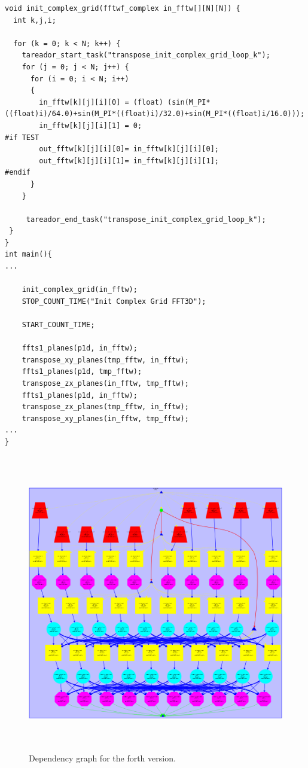 \documentclass[12]{article}
\begin{document}
\begin{lstlisting}
void init_complex_grid(fftwf_complex in_fftw[][N][N]) {
  int k,j,i;

  for (k = 0; k < N; k++) {
    tareador_start_task("transpose_init_complex_grid_loop_k");
    for (j = 0; j < N; j++) {
      for (i = 0; i < N; i++)
      {
        in_fftw[k][j][i][0] = (float) (sin(M_PI*((float)i)/64.0)+sin(M_PI*((float)i)/32.0)+sin(M_PI*((float)i/16.0)));
        in_fftw[k][j][i][1] = 0;
#if TEST
        out_fftw[k][j][i][0]= in_fftw[k][j][i][0];
        out_fftw[k][j][i][1]= in_fftw[k][j][i][1];
#endif
      }
    }
 
     tareador_end_task("transpose_init_complex_grid_loop_k"); 
 }
}
int main(){
...

    init_complex_grid(in_fftw);
    STOP_COUNT_TIME("Init Complex Grid FFT3D");

    START_COUNT_TIME;

    ffts1_planes(p1d, in_fftw);
    transpose_xy_planes(tmp_fftw, in_fftw);
    ffts1_planes(p1d, tmp_fftw);
    transpose_zx_planes(in_fftw, tmp_fftw);
    ffts1_planes(p1d, in_fftw);
    transpose_zx_planes(tmp_fftw, in_fftw);
    transpose_xy_planes(in_fftw, tmp_fftw);
...
}

\end{lstlisting}

\begin{figure}[H]
\centering  \includegraphics[width=\linewidth , height=13cm, width=13cm  ]{images/dependency_graph4.png}
  \caption{Dependency graph for the forth version.}
  \label{fig:Dependency4rth}
\end{figure}
\end{document}
